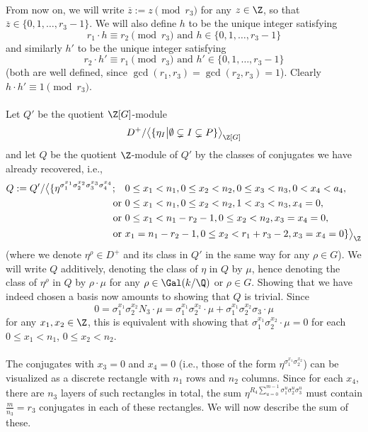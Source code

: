 \paragraph*{}
From now on, we will write $\overline{z}:=z\pmod{r_3}$ for any $z\in\Z$, so that $\overline{z}\in\{0,1,\dots,r_3-1\}$.
We will also define $h$ to be the unique integer satisfying $$r_1\cdot h\equiv r_2\pmod{r_3} \text{ and } h\in\{0,1,\dots,r_3-1\}$$ and similarly $h'$ to be the unique integer satisfying $$ r_2\cdot h'\equiv r_1\pmod{r_3} \text { and } h'\in\{0,1,\dots,r_3-1\}$$ (both are well defined, since $\gcd(r_1,r_3)=\gcd(r_2,r_3)=1$). Clearly $h\cdot h'\equiv 1 \pmod{r_3}$.

\paragraph*{}
Let $Q'$ be the quotient $\Z[G]$-module $$D^+/\big\langle \{\eta_I \big\vert \emptyset \subsetneq I \subsetneq P \}\big\rangle_{\Z[G]}$$
and let $Q$ be the quotient $\Z$-module of $Q'$ by the classes of conjugates we have already recovered, i.e.,
\begin{align*}
Q:=Q'/\big\langle \{\eta^{\sigma_1^{x_1}\sigma_2^{x_2}\sigma_3^{x_3}\sigma_4^{x_4}}; \quad & 0\leq x_1< n_1, 0\leq x_2<n_2, 0\leq x_3<n_3,0< x_4<a_4,\\
\text { or }& 0\leq x_1< n_1, 0\leq x_2<n_2, 1< x_3<n_3,x_4=0,\\
\text { or }& 0\leq x_1< n_1-r_2-1, 0\leq x_2<n_2, x_3=x_4=0,\\
\text { or }& x_1= n_1-r_2-1, 0\leq x_2<r_1+r_3-2, x_3=x_4=0 \}\big\rangle_{\Z}
\end{align*}
(where we denote $\eta^{\rho}\in D^+$ and its class in $Q'$ in the same way for any $\rho\in G$).
We will write $Q$ additively, denoting the class of $\eta$ in $Q$ by $\mu$, hence denoting the class of $\eta^{\rho}$ in $Q$ by $\rho\cdot \mu$ for any $\rho\in\Gal(k/\Q)$ or $\rho\in G$.
Showing that we have indeed chosen a basis now amounts to showing that $Q$ is trivial. Since $$0=\sigma_1^{x_1}\sigma_2^{x_2}N_3\cdot \mu=\sigma_1^{x_1}\sigma_2^{x_2}\cdot \mu+\sigma_1^{x_1}\sigma_2^{x_2}\sigma_3\cdot \mu$$
for any $x_1,x_2\in\Z$,
this is equivalent with showing that $\sigma_1^{x_1}\sigma_2^{x_2}\cdot \mu=0$ for each $0\leq x_1<n_1$, $0\leq x_2<n_2$.

\paragraph*{}
The conjugates with $x_3=0$ and $x_4=0$ (i.e., those of the form $\eta^{\sigma_1^{x_1}\sigma_2^{x_2}}$) can be visualized as a discrete rectangle with $n_1$ rows and $n_2$ columns. Since for each $x_4$, there are $n_3$ layers of such rectangles in total, the sum $\eta^{R_4\sum_{u=0}^{m-1}\sigma_1^{u}\sigma_2^{u}\sigma_3^{u}}$ must contain $\frac{m}{n_3}=r_3$ conjugates in each of these rectangles. We will now describe the sum of these. 

